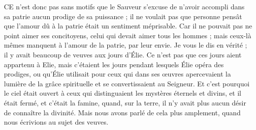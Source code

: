 CE n’est donc pas sans motifs que le Sauveur s’excuse de n’avoir accompli dans sa patrie aucun prodige de sa puissance ; il ne voulait pas que personne pensât que l’amour dû à la patrie était un sentiment méprisable. Car il ne pouvait pas ne point aimer ses concitoyens, celui qui devait aimer tous les hommes ; mais ceux-là mêmes manquent à l’amour de la patrie, par leur envie. Je vous le dis en vérité ; il y avait beaucoup de veuves aux jours d'Élie. Ce n’est pas que ces jours aient appartenu à Elie, mais c’étaient les jours pendant lesquels Élie opéra des prodiges, ou qu’Élie utilisait pour ceux qui dans ses œuvres apercevaient la lumière de la grâce spirituelle et se convertissaient au Seigneur. Et c’est pourquoi le ciel était ouvert à ceux qui distinguaient les mystères éternels et divins, et il était fermé, et c’était la famine, quand, sur la terre, il n’y avait plus aucun désir de connaître la divinité. Mais nous avons parlé de cela plus amplement, quand nous écrivions au sujet des veuves.
